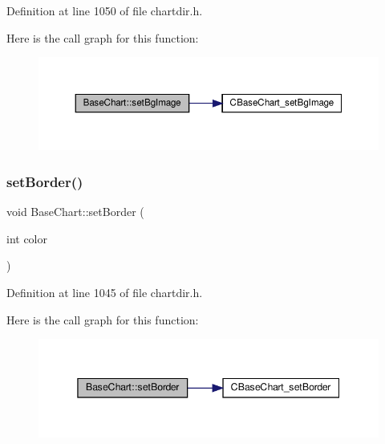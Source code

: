 Definition at line 1050 of file chartdir.\+h.

Here is the call graph for this function\+:
\nopagebreak
\begin{figure}[H]
\begin{center}
\leavevmode
\includegraphics[width=350pt]{class_base_chart_a0e8bd2475ae0d998d5936ebeb307c5e1_cgraph}
\end{center}
\end{figure}
\mbox{\label{class_base_chart_a4fe0267a113dda54c013c23679125973}} 
\subsubsection{\texorpdfstring{set\+Border()}{setBorder()}}
{\footnotesize\ttfamily void Base\+Chart\+::set\+Border (\begin{DoxyParamCaption}\item[{int}]{color }\end{DoxyParamCaption})\hspace{0.3cm}{\ttfamily [inline]}}



Definition at line 1045 of file chartdir.\+h.

Here is the call graph for this function\+:
\nopagebreak
\begin{figure}[H]
\begin{center}
\leavevmode
\includegraphics[width=345pt]{class_base_chart_a4fe0267a113dda54c013c23679125973_cgraph}
\end{center}
\end{figure}
\mbox{\label{class_base_chart_a8ec5ca1cea984df560c860edb0a04121}} 
